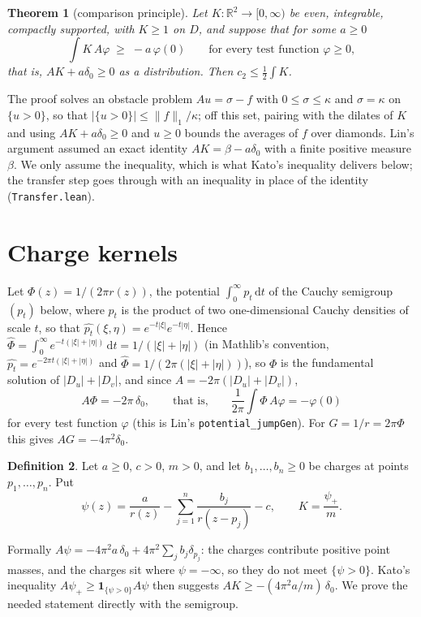 \documentclass[11pt]{amsart}
\newtheorem{theorem}{Theorem}[section]
\theoremstyle{definition}
\newtheorem{definition}[theorem]{Definition}
\theoremstyle{remark}
\newcommand{\R}{\mathbb{R}}
\newcommand{\lean}[1]{\texttt{#1}}
\newcommand{\dd}{\,\mathrm{d}}
\begin{document}
\begin{theorem}[comparison principle]\label{thm:comparison}
Let $K : \R^2 \to [0,\infty)$ be even, integrable, compactly supported, with $K \ge 1$ on $D$, and
suppose that for some $a \ge 0$
\[ \int K\, A\varphi \;\ge\; -a\,\varphi(0) \qquad \text{for every test function } \varphi \ge 0, \]
that is, $AK + a\delta_0 \ge 0$ as a distribution. Then $c_2 \le \frac12 \int K$.
\end{theorem}

The proof solves an obstacle problem $Au = \sigma - f$ with $0 \le \sigma \le \kappa$ and
$\sigma = \kappa$ on $\{u > 0\}$, so that $|\{u>0\}| \le \|f\|_1/\kappa$; off this set, pairing with
the dilates of $K$ and using $AK + a\delta_0 \ge 0$ and $u \ge 0$ bounds the averages of $f$ over
diamonds. Lin's argument assumed an exact identity $AK = \beta - a\delta_0$ with a finite positive
measure $\beta$. We only assume the inequality, which is what Kato's inequality delivers below; the
transfer step goes through with an inequality in place of the identity (\lean{Transfer.lean}).

\section{Charge kernels}\label{sec:charges}

Let $\Phi(z) = 1/(2\pi r(z))$, the potential $\int_0^\infty p_t \dd t$ of the Cauchy semigroup $(p_t)$
below, where $p_t$ is the product of two one-dimensional Cauchy densities of scale $t$, so that
$\widehat{p_t}(\xi,\eta) = e^{-t|\xi|} e^{-t|\eta|}$. Hence
$\widehat\Phi = \int_0^\infty e^{-t(|\xi|+|\eta|)} \dd t = 1/(|\xi|+|\eta|)$ (in Mathlib's convention,
$\widehat{p_t} = e^{-2\pi t(|\xi|+|\eta|)}$ and $\widehat\Phi = 1/(2\pi(|\xi|+|\eta|))$), so
$\Phi$ is the fundamental solution of $|D_u| + |D_v|$, and since $A = -2\pi(|D_u|+|D_v|)$,
\[ A\Phi = -2\pi\,\delta_0, \qquad\text{that is,}\qquad \frac{1}{2\pi}\int \Phi\, A\varphi = -\varphi(0) \]
for every test function $\varphi$ (this is Lin's \lean{potential\_jumpGen}). For $G = 1/r = 2\pi\Phi$ this
gives $AG = -4\pi^2\delta_0$.

\begin{definition}
Let $a \ge 0$, $c > 0$, $m > 0$, and let $b_1, \dots, b_n \ge 0$ be charges at points $p_1, \dots, p_n$.
Put
\[ \psi(z) = \frac{a}{r(z)} - \sum_{j=1}^n \frac{b_j}{r(z - p_j)} - c, \qquad K = \frac{\psi_+}{m} . \]
\end{definition}

Formally $A\psi = -4\pi^2 a\,\delta_0 + 4\pi^2 \sum_j b_j \delta_{p_j}$: the charges contribute positive
point masses, and the charges sit where $\psi = -\infty$, so they do not meet $\{\psi > 0\}$.
Kato's inequality $A\psi_+ \ge \mathbf 1_{\{\psi>0\}} A\psi$ then suggests
$AK \ge -(4\pi^2 a/m)\,\delta_0$. We prove the needed statement directly with the semigroup.
\end{document}
